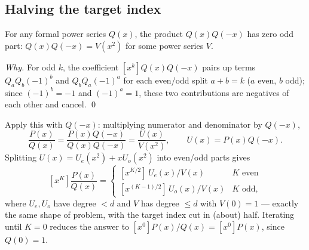 \documentclass[11pt]{article}
\begin{document}
\subsection{Halving the target index}
\begin{theorembox}
For any formal power series $Q(x)$, the product $Q(x)Q(-x)$ has zero odd
part: $Q(x)Q(-x) = V(x^2)$ for some power series $V$.

\emph{Why.} For odd $k$, the coefficient $[x^k]Q(x)Q(-x)$ pairs up terms
$Q_a Q_b(-1)^b$ and $Q_b Q_a(-1)^a$ for each even/odd split $a+b=k$
($a$ even, $b$ odd); since $(-1)^b=-1$ and $(-1)^a=1$, these two
contributions are negatives of each other and cancel. \qed
\end{theorembox}

Apply this with $Q(-x)$: multiplying numerator and denominator by
$Q(-x)$,
\[
  \frac{P(x)}{Q(x)} = \frac{P(x)Q(-x)}{Q(x)Q(-x)} = \frac{U(x)}{V(x^2)},
  \qquad U(x) = P(x)Q(-x).
\]
Splitting $U(x) = U_e(x^2) + xU_o(x^2)$ into even/odd parts gives
\[
  [x^K]\frac{P(x)}{Q(x)} =
  \begin{cases}
    [x^{K/2}]\, U_e(x)/V(x) & K \text{ even} \\
    [x^{(K-1)/2}]\, U_o(x)/V(x) & K \text{ odd,}
  \end{cases}
\]
where $U_e, U_o$ have degree $< d$ and $V$ has degree $\le d$ with
$V(0)=1$ --- exactly the same shape of problem, with the target index cut
in (about) half. Iterating until $K=0$ reduces the answer to
$[x^0]P(x)/Q(x) = [x^0]P(x)$, since $Q(0)=1$.
\end{document}
